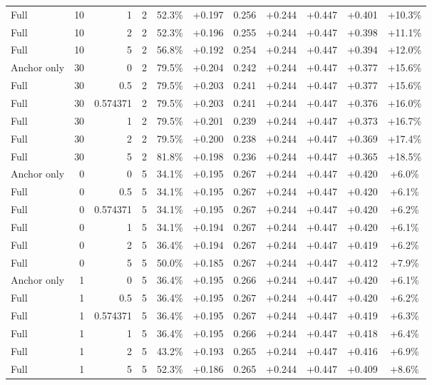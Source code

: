\begin{table}[htbp]
\begin{tabular}{lrrrccccccc}
Full & 10 & 1 & 2 & 52.3\% & +0.197 & 0.256 & +0.244 & +0.447 & +0.401 & +10.3\% \\
Full & 10 & 2 & 2 & 52.3\% & +0.196 & 0.255 & +0.244 & +0.447 & +0.398 & +11.1\% \\
Full & 10 & 5 & 2 & 56.8\% & +0.192 & 0.254 & +0.244 & +0.447 & +0.394 & +12.0\% \\
Anchor only & 30 & 0 & 2 & 79.5\% & +0.204 & 0.242 & +0.244 & +0.447 & +0.377 & +15.6\% \\
Full & 30 & 0.5 & 2 & 79.5\% & +0.203 & 0.241 & +0.244 & +0.447 & +0.377 & +15.6\% \\
Full & 30 & 0.574371 & 2 & 79.5\% & +0.203 & 0.241 & +0.244 & +0.447 & +0.376 & +16.0\% \\
Full & 30 & 1 & 2 & 79.5\% & +0.201 & 0.239 & +0.244 & +0.447 & +0.373 & +16.7\% \\
Full & 30 & 2 & 2 & 79.5\% & +0.200 & 0.238 & +0.244 & +0.447 & +0.369 & +17.4\% \\
Full & 30 & 5 & 2 & 81.8\% & +0.198 & 0.236 & +0.244 & +0.447 & +0.365 & +18.5\% \\
Anchor only & 0 & 0 & 5 & 34.1\% & +0.195 & 0.267 & +0.244 & +0.447 & +0.420 & +6.0\% \\
Full & 0 & 0.5 & 5 & 34.1\% & +0.195 & 0.267 & +0.244 & +0.447 & +0.420 & +6.1\% \\
Full & 0 & 0.574371 & 5 & 34.1\% & +0.195 & 0.267 & +0.244 & +0.447 & +0.420 & +6.2\% \\
Full & 0 & 1 & 5 & 34.1\% & +0.194 & 0.267 & +0.244 & +0.447 & +0.420 & +6.1\% \\
Full & 0 & 2 & 5 & 36.4\% & +0.194 & 0.267 & +0.244 & +0.447 & +0.419 & +6.2\% \\
Full & 0 & 5 & 5 & 50.0\% & +0.185 & 0.267 & +0.244 & +0.447 & +0.412 & +7.9\% \\
Anchor only & 1 & 0 & 5 & 36.4\% & +0.195 & 0.266 & +0.244 & +0.447 & +0.420 & +6.1\% \\
Full & 1 & 0.5 & 5 & 36.4\% & +0.195 & 0.267 & +0.244 & +0.447 & +0.420 & +6.2\% \\
Full & 1 & 0.574371 & 5 & 36.4\% & +0.195 & 0.267 & +0.244 & +0.447 & +0.419 & +6.3\% \\
Full & 1 & 1 & 5 & 36.4\% & +0.195 & 0.266 & +0.244 & +0.447 & +0.418 & +6.4\% \\
Full & 1 & 2 & 5 & 43.2\% & +0.193 & 0.265 & +0.244 & +0.447 & +0.416 & +6.9\% \\
Full & 1 & 5 & 5 & 52.3\% & +0.186 & 0.265 & +0.244 & +0.447 & +0.409 & +8.6\% \\

\end{tabular}
\end{table}
